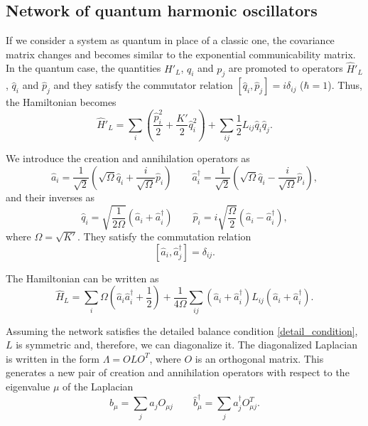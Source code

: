 \subsection{Network of quantum harmonic oscillators}

If we consider a system as quantum in place of a classic one, the covariance matrix changes and becomes similar to the exponential communicability matrix.
In the quantum case, the quantities $H'_L$, $q_i$ and $p_j$ are promoted to operators $\hat H'_L$, $\hat q_i$ and $\hat p_j$ and they satisfy the commutator relation $\left[\hat q_i, \hat p_j\right] = i \delta_{ij}$ ($\hbar = 1$). Thus, the Hamiltonian becomes
\begin{equation}\label{H_L_QM}
    \hat H'_L = \sum_i\left(\frac{\hat p_i^2}{2}+\frac{K'}{2}\hat q_i^2\right) + \sum_{ij}\frac{1}{2} L_{ij}\hat q_i\hat q_j.
\end{equation}

We introduce the creation and annihilation operators as
\begin{equation}
     \hat a_i = \frac{1}{\sqrt{2}}\left(\sqrt{\Omega} \hat q_i + \frac{i}{\sqrt{\Omega}}\hat p_i\right) \qquad 
     \hat a_i^\dagger = \frac{1}{\sqrt{2}}\left(\sqrt{\Omega} \hat q_i - \frac{i}{\sqrt{\Omega}}\hat p_i\right), 
\end{equation}
and their inverses as
\begin{equation}
    \hat q_i = \sqrt{\frac{1}{2\Omega}}\left(\hat a_i + \hat a_i^\dagger\right) \qquad
    \hat p_i = i\sqrt{\frac{\Omega}{2}}\left(\hat a_i - \hat a_i^\dagger\right),
\end{equation}
where $\Omega = \sqrt{K'}$.
They satisfy the commutation relation 
\begin{equation}
    \left[\hat a_i, \hat a^\dagger_j\right] = \delta_{ij}.
\end{equation}

The Hamiltonian can be written as 
\begin{equation}
    \hat H_L = \sum_i \Omega \left(\hat a_i\hat a^\dagger_i + \frac{1}{2}\right) + \frac{1}{4\Omega}\sum_{ij}\left(\hat a_i +\hat a_i^\dagger\right)L_{ij}\left(\hat a_i +\hat a_i^\dagger\right).
\end{equation}

Assuming the network satisfies the detailed balance condition \eqref{detail_condition}, $L$ is symmetric and, therefore, we can diagonalize it. The diagonalized Laplacian is written in the form $\Lambda = OLO^T$, where $O$ is an orthogonal matrix.
This generates a new pair of creation and annihilation operators with respect to the eigenvalue $\mu$ of the Laplacian
\begin{equation}
    b_\mu = \sum_j a_jO_{\mu j}  \qquad \hat b_\mu^\dagger = \sum_j a_j^\dagger O^T_{\mu j} .
\end{equation}


